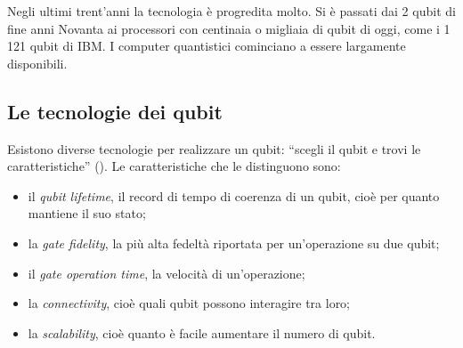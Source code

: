 Negli ultimi trent'anni la tecnologia è progredita molto. Si è passati dai 2 qubit di fine anni Novanta ai processori
con centinaia o migliaia di qubit di oggi, come i 1\,121 qubit di IBM. I computer quantistici cominciano a essere
largamente disponibili.

\subsection{Le tecnologie dei qubit}
\label{sec:qse-tecnologie}

Esistono diverse tecnologie per realizzare un qubit: ``scegli il qubit e trovi le caratteristiche''
(). Le caratteristiche che le distinguono sono:
\begin{itemize}
  \item il \emph{qubit lifetime}, il record di tempo di coerenza di un qubit, cioè per quanto mantiene il suo stato;
  \item la \emph{gate fidelity}, la più alta fedeltà riportata per un'operazione su due qubit;
  \item il \emph{gate operation time}, la velocità di un'operazione;
  \item la \emph{connectivity}, cioè quali qubit possono interagire tra loro;
  \item la \emph{scalability}, cioè quanto è facile aumentare il numero di qubit.
\end{itemize}

